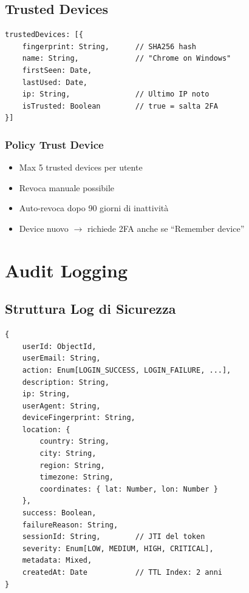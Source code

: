 \documentclass[12pt,a4paper]{report}
\begin{document}
\section{Trusted Devices}

\begin{lstlisting}[caption={Trusted Device Schema}]
trustedDevices: [{
    fingerprint: String,      // SHA256 hash
    name: String,             // "Chrome on Windows"
    firstSeen: Date,
    lastUsed: Date,
    ip: String,               // Ultimo IP noto
    isTrusted: Boolean        // true = salta 2FA
}]
\end{lstlisting}

\subsection{Policy Trust Device}

\begin{itemize}
    \item Max 5 trusted devices per utente
    \item Revoca manuale possibile
    \item Auto-revoca dopo 90 giorni di inattività
    \item Device nuovo $\rightarrow$ richiede 2FA anche se ``Remember device''
\end{itemize}

\chapter{Audit Logging}

\section{Struttura Log di Sicurezza}

\begin{lstlisting}[caption={Audit Log Schema}]
{
    userId: ObjectId,
    userEmail: String,
    action: Enum[LOGIN_SUCCESS, LOGIN_FAILURE, ...],
    description: String,
    ip: String,
    userAgent: String,
    deviceFingerprint: String,
    location: {
        country: String,
        city: String,
        region: String,
        timezone: String,
        coordinates: { lat: Number, lon: Number }
    },
    success: Boolean,
    failureReason: String,
    sessionId: String,        // JTI del token
    severity: Enum[LOW, MEDIUM, HIGH, CRITICAL],
    metadata: Mixed,
    createdAt: Date           // TTL Index: 2 anni
}
\end{lstlisting}
\end{document}
